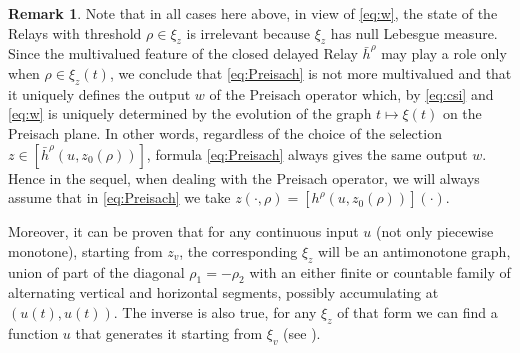 \documentclass[12pt]{article}
\newcommand{\p}{\rho}
\newcommand{\1}{\mathds{1}}
\theoremstyle{definition}
\newtheorem{rmk}[teo]{Remark}
\begin{document}
\begin{rmk}\label{rmk:scelta}Note that in all cases here above, in view of \eqref{eq:w}, the state of the Relays with threshold $\rho\in\xi_z$ is irrelevant because $\xi_z$ has null Lebesgue measure. Since the multivalued feature of the closed delayed Relay $\bar{h}^\rho$ may play a role only when $\rho\in\xi_z(t)$, we conclude that \eqref{eq:Preisach} is not more multivalued and that it uniquely defines the output $w$ of the Preisach operator which, by \eqref{eq:csi} and \eqref{eq:w} is uniquely determined by the evolution of the graph $t\mapsto\xi(t)$ on the Preisach plane. In other words, regardless of the choice of the selection $z\in[\bar{h}^\p (u, z_0(\p))]$, formula \eqref{eq:Preisach} always gives the same output $w$. Hence in the sequel, when dealing with the Preisach operator, we will always assume that in \eqref{eq:Preisach} we take $z(\cdot,\rho)=[h^\rho(u,z_0(\rho))](\cdot)$.

Moreover, it can be proven that for any continuous input $u$ (not only piecewise monotone), starting from $z_v$, the corresponding $\xi_z$ will be an antimonotone graph, union of part of the diagonal $\p_1=-\p_2$ with an either finite or countable family of alternating vertical and horizontal segments, possibly accumulating at $(u(t),u(t))$. The inverse is also true, for any $\xi_z$ of that form we can find a function $u$ that generates it starting from $\xi_v$ (see \cite[Theorem~2.2 Chapter~IV]{AVH}). 
\end{rmk}
\end{document}
